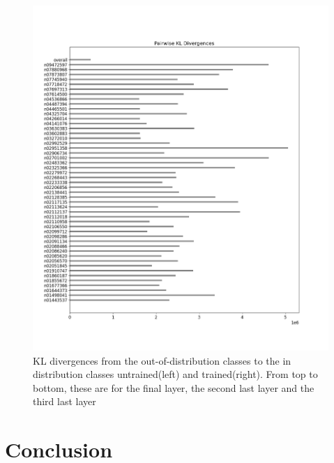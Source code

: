\documentclass{article}
\begin{document}
\begin{figure}[H]
\begin{minipage}{0.45\textwidth}
        \end{minipage}\hfill
        \begin{minipage}{0.45\textwidth}
            \centering
            \includegraphics[width=\textwidth]{cross_imagenet_imgr_r_third_last/alexnet_kl_div_b_to_apairwise.png} %
        \end{minipage}
    \caption{KL divergences from the out-of-distribution classes to the in distribution classes untrained(left) and trained(right). From top to bottom, these are for the final layer, the second last layer and the third last layer}
        \label{fig:cross_kl_divergence_b_to_a}
    \end{figure}
    \section{Conclusion}
        
\end{document}
